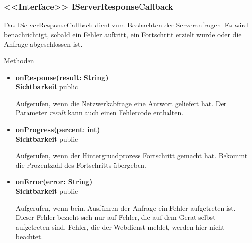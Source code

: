 \subsubsection{<<Interface>> IServerResponseCallback} \label{app:klasse:IServerResponseCallback}
Das IServerResponseCallback dient zum Beobachten der Serveranfragen. Es wird benachrichtigt, sobald ein Fehler auftritt, ein Fortschritt erzielt wurde oder die Anfrage abgeschlossen ist.
\newline

\underline{Methoden}
\begin{itemize}
\itemsep0pt
\item \textbf{onResponse(result: String)}\hfill\\
\textbf{Sichtbarkeit} public

Aufgerufen, wenn die Netzwerkabfrage eine Antwort geliefert hat. Der Parameter \textit{result} kann auch einen Fehlercode enthalten.

\item \textbf{onProgress(percent: int)}\hfill\\
\textbf{Sichtbarkeit} public

Aufgerufen, wenn der Hintergrundprozess Fortschritt gemacht hat. Bekommt die Prozentzahl des Fortschritts übergeben.

\item \textbf{onError(error: String)}\hfill\\
\textbf{Sichtbarkeit} public

Aufgerufen, wenn beim Ausführen der Anfrage ein Fehler aufgetreten ist. Dieser Fehler bezieht sich nur auf Fehler, die auf dem Gerät selbst aufgetreten sind. Fehler, die der Webdienst meldet, werden hier nicht beachtet.

\end{itemize}

